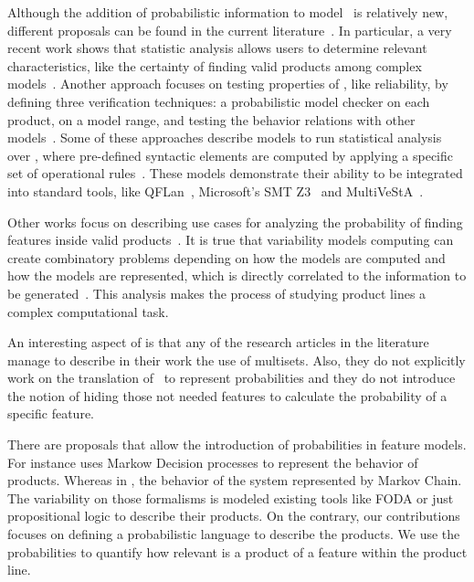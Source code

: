Although the addition of probabilistic information to model \SPLs\ is relatively new, different proposals can be found in the current literature~\cite{chssgl13,tllv15,tlll15,dpcslsh17}. In particular, a very recent
work shows that statistic analysis allows users to determine relevant characteristics, like the certainty of finding valid products among complex models~\cite{dpcslsh17}.
%
Another approach focuses on testing properties of \SPLs, like reliability, by defining three verification techniques: a probabilistic model checker on each product, on a model range, and testing the behavior relations with other models~\cite{chssgl13}.
%
Some of these approaches describe models to run statistical analysis over \SPLs, where pre-defined syntactic elements are computed by applying a specific set of operational rules~\cite{tllv15,tlll15}. These models demonstrate their ability to be integrated into standard tools, like QFLan~\cite{tlll15}, Microsoft's SMT Z3~\cite{ln08} and MultiVeStA~\cite{sa13}.
%
%

Other works focus on describing use cases for analyzing the probability of finding features inside valid products~\cite{dpcslsh17}.
It is true that variability models computing can create combinatory problems
depending on how the models are computed and how the models are represented, which is directly
correlated to the information to be generated~\cite{dpcslsh17}.
This analysis makes the process of studying product lines a complex computational  task.

An interesting aspect of \fodaPAp is that
any of the research articles in the literature manage
to describe in their work the use of multisets.
Also, they do not explicitly work on
the translation of \FODA\ to represent probabilities and they do
not introduce the notion of hiding those not needed features to
calculate the probability of a specific feature.
%
%
%
%
%


There are proposals that allow the introduction of probabilities in
feature models. For instance \cite{Dubslaff2015} uses Markow Decision
processes to represent the behavior of products. Whereas in
\cite{vk13}, the behavior of the system represented by Markov Chain.
The variability on those formalisms is modeled existing tools like FODA or
just propositional logic to describe their products.
On the contrary, our
contributions focuses on defining a probabilistic language to describe
the products. We use the probabilities to quantify how relevant is a
product of a feature within the product line.

